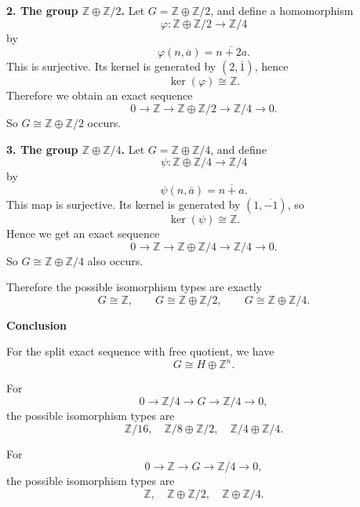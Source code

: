 \begin{solution}
\par

\noindent
\textbf{2. The group \(\mathbb Z\oplus \mathbb Z/2\).}
Let \(G=\mathbb Z\oplus \mathbb Z/2\), and define a homomorphism
\[
\varphi:\mathbb Z\oplus \mathbb Z/2\to \mathbb Z/4
\]
by
\[
\varphi(n,\overline a)=\overline{n+2a}.
\]
This is surjective. Its kernel is generated by \((2,\overline 1)\), hence
\[
\ker(\varphi)\cong \mathbb Z.
\]
Therefore we obtain an exact sequence
\[
0\longrightarrow \mathbb Z \longrightarrow \mathbb Z\oplus \mathbb Z/2 \longrightarrow \mathbb Z/4 \longrightarrow 0.
\]
So \(G\cong \mathbb Z\oplus \mathbb Z/2\) occurs.

\par

\noindent
\textbf{3. The group \(\mathbb Z\oplus \mathbb Z/4\).}
Let \(G=\mathbb Z\oplus \mathbb Z/4\), and define
\[
\psi:\mathbb Z\oplus \mathbb Z/4\to \mathbb Z/4
\]
by
\[
\psi(n,\overline a)=\overline{n+a}.
\]
This map is surjective. Its kernel is generated by \((1,\overline{-1})\), so
\[
\ker(\psi)\cong \mathbb Z.
\]
Hence we get an exact sequence
\[
0\longrightarrow \mathbb Z \longrightarrow \mathbb Z\oplus \mathbb Z/4 \longrightarrow \mathbb Z/4 \longrightarrow 0.
\]
So \(G\cong \mathbb Z\oplus \mathbb Z/4\) also occurs.

Therefore the possible isomorphism types are exactly
\[
\boxed{
	G\cong \mathbb Z,
	\qquad
	G\cong \mathbb Z\oplus \mathbb Z/2,
	\qquad
	G\cong \mathbb Z\oplus \mathbb Z/4.
}
\]


\medskip
\noindent\textbf{Conclusion}\par
\smallskip


For the split exact sequence with free quotient, we have
\[
\boxed{G\cong H\oplus \mathbb Z^n.}
\]

For
\[
0\to \mathbb Z/4\to G\to \mathbb Z/4\to 0,
\]
the possible isomorphism types are
\[
\boxed{
	\mathbb Z/16,\quad
	\mathbb Z/8\oplus \mathbb Z/2,\quad
	\mathbb Z/4\oplus \mathbb Z/4.
}
\]

For
\[
0\to \mathbb Z\to G\to \mathbb Z/4\to 0,
\]
the possible isomorphism types are
\[
\boxed{
	\mathbb Z,\quad
	\mathbb Z\oplus \mathbb Z/2,\quad
	\mathbb Z\oplus \mathbb Z/4.
}
\]
\end{solution}

